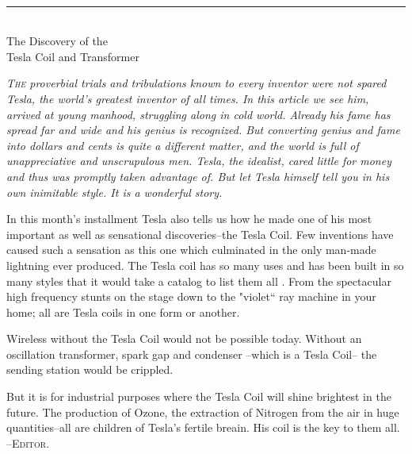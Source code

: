 \documentclass[a4paper,12pt,english,twoside,openright]{memoir}
\begin{document}
\cleardoublepage
\thispagestyle{empty}
\vspace*{5em}
\begin{center}
	\bfseries
	\\
	\noindent\rule{.5\linewidth}{1pt}\\
	\medskip
	{\noindent\LARGE The Discovery of the\\Tesla Coil and Transformer}
	
	\bigskip
	{\normalfont\smallskip\footnotesize\protect\parbox{.75\linewidth}{\itshape
			\lettrine[lines=2]{T}{he} proverbial trials and tribulations known to every inventor were not spared Tesla, the world's greatest inventor of all times. In this article we see him, arrived at young manhood, struggling along in cold world. Already his fame has spread far and wide and his genius is recognized. But converting genius and fame into dollars and cents is quite a different matter, and the world is full of unappreciative and unscrupulous men. Tesla, the idealist, cared little for money and thus was promptly taken advantage of. But let Tesla himself tell you in his own inimitable style. It is a wonderful story.
			
			In this month's installment Tesla also tells us how he made one of his most important as well as sensational discoveries--the Tesla Coil. Few inventions have caused such a sensation as this one which culminated in the only man-made lightning ever produced. The Tesla coil has so many uses and has been built in so many styles that it would take a catalog to list them all . From the spectacular high frequency stunts on the stage down to the "violet`` ray machine in your home; all are Tesla coils in one form or another.
			
			Wireless without the Tesla Coil would not be possible today. Without an oscillation transformer, spark gap and condenser --which is a Tesla Coil-- the sending station would be crippled.
			
			But it is for industrial purposes where the Tesla Coil will shine brightest in the future. The production of Ozone, the extraction of Nitrogen from the air in huge quantities--all are children of Tesla's fertile breain. His coil is the key to them all.\\
			
			\hfill --\scshape{Editor}.
		}
		\par
	}
	\vspace*{5em}
\end{center}
\end{document}
